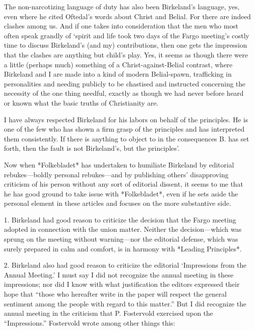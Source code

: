 The non-narcotizing language of duty has also been Birkeland’s language, yes, even where he cited Oftedal’s words about Christ and Belial. For there are indeed clashes among us. And if one takes into consideration that the men who most often speak grandly of ‘spirit and life took two days of the Fargo meeting’s costly time to discuss Birkeland’s (and my) contributions, then one gets the impression that the clashes are anything but child’s play. Yes, it seems as though there were a little (perhaps much) something of a Christ-against-Belial contrast, where Birkeland and I are made into a kind of modern Belial-spawn, trafficking in personalities and needing publicly to be chastised and instructed concerning the necessity of the one thing needful, exactly as though we had never before heard or known what the basic truths of Christianity are.

I have always respected Birkeland for his labors on behalf of the principles. He is one of the few who has shown a firm grasp of the principles and has interpreted them consistently. If there is anything to object to in the consequences B. has set forth, then the fault is not Birkeland’s, but the principles’.

Now when *Folkebladet* has undertaken to humiliate Birkeland by editorial rebukes—boldly personal rebukes—and by publishing others’ disapproving criticism of his person without any sort of editorial dissent, it seems to me that he has good ground to take issue with *Folkebladet*, even if he sets aside the personal element in these articles and focuses on the more substantive side.

1. Birkeland had good reason to criticize the decision that the Fargo meeting adopted in connection with the union matter. Neither the decision—which was sprung on the meeting without warning—nor the editorial defense, which was surely prepared in calm and comfort, is in harmony with *Leading Principles*.

2. Birkeland also had good reason to criticize the editorial ‘Impressions from the Annual Meeting.’ I must say I did not recognize the annual meeting in these impressions; nor did I know with what justification the editors expressed their hope that “those who hereafter write in the paper will respect the general sentiment among the people with regard to this matter.” But I did recognize the annual meeting in the criticism that P. Fostervold exercised upon the “Impressions.” Fostervold wrote among other things this:

